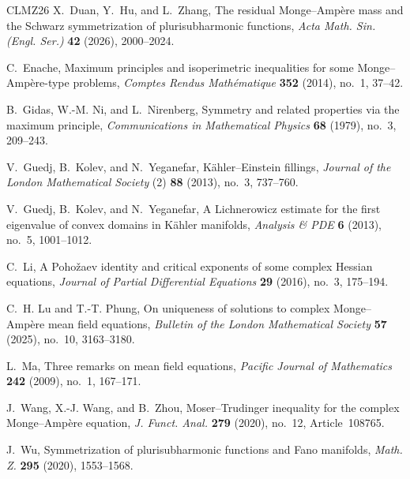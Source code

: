 \documentclass[11pt]{article}
\begin{document}
\begin{thebibliography}{CLMZ26}
X.~Duan, Y.~Hu, and L.~Zhang, The residual {Monge--Amp\`ere} mass and the
  {Schwarz} symmetrization of plurisubharmonic functions, \emph{Acta Math. Sin.
  (Engl. Ser.)} \textbf{42} (2026), \mbox{2000--2024}.

C.~Enache, Maximum principles and isoperimetric inequalities for some
  {Monge--Amp\`ere}-type problems, \emph{Comptes Rendus Math\'ematique}
  \textbf{352} (2014), no.~1, \mbox{37--42}.

B.~Gidas, W.-M. Ni, and L.~Nirenberg, Symmetry and related properties via the
  maximum principle, \emph{Communications in Mathematical Physics} \textbf{68}
  (1979), no.~3, \mbox{209--243}.

V.~Guedj, B.~Kolev, and N.~Yeganefar, {K\"ahler--Einstein} fillings,
  \emph{Journal of the London Mathematical Society} (2) \textbf{88} (2013),
  no.~3, \mbox{737--760}.

V.~Guedj, B.~Kolev, and N.~Yeganefar, A {Lichnerowicz} estimate for the first
  eigenvalue of convex domains in {K\"ahler} manifolds, \emph{Analysis \& PDE}
  \textbf{6} (2013), no.~5, \mbox{1001--1012}.

C.~Li, A {Poho\v zaev} identity and critical exponents of some complex
  {Hessian} equations, \emph{Journal of Partial Differential Equations}
  \textbf{29} (2016), no.~3, \mbox{175--194}.

C.~H. Lu and T.-T. Phung, On uniqueness of solutions to complex
  {Monge--Amp\`ere} mean field equations, \emph{Bulletin of the London
  Mathematical Society} \textbf{57} (2025), no.~10, \mbox{3163--3180}.

L.~Ma, Three remarks on mean field equations, \emph{Pacific Journal of
  Mathematics} \textbf{242} (2009), no.~1, \mbox{167--171}.

J.~Wang, X.-J. Wang, and B.~Zhou, {Moser--Trudinger} inequality for the complex
  {Monge--Amp\`ere} equation, \emph{J. Funct. Anal.} \textbf{279} (2020),
  no.~12, Article~108765.

J.~Wu, Symmetrization of plurisubharmonic functions and {Fano} manifolds,
  \emph{Math. Z.} \textbf{295} (2020), \mbox{1553--1568}.

\end{thebibliography}
\endgroup
\end{document}
